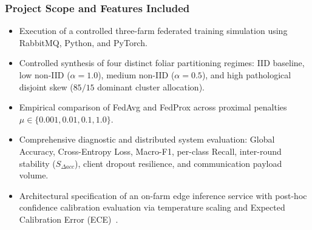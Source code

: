 \documentclass[applsci,article,submit,oneauthor,pdftex]{Definitions/mdpi}
\begin{document}
\subsubsection{Project Scope and Features Included}
\begin{itemize}[leftmargin=*]
    \item Execution of a controlled three-farm federated training simulation using RabbitMQ, Python, and PyTorch.
    \item Controlled synthesis of four distinct foliar partitioning regimes: IID baseline, low non-IID ($\alpha = 1.0$), medium non-IID ($\alpha = 0.5$), and high pathological disjoint skew ($85/15$ dominant cluster allocation).
    \item Empirical comparison of FedAvg and FedProx across proximal penalties $\mu \in \{0.001, 0.01, 0.1, 1.0\}$.
    \item Comprehensive diagnostic and distributed system evaluation: Global Accuracy, Cross-Entropy Loss, Macro-F1, per-class Recall, inter-round stability ($S_{\Delta acc}$), client dropout resilience, and communication payload volume.
    \item Architectural specification of an on-farm edge inference service with post-hoc confidence calibration evaluation via temperature scaling and Expected Calibration Error (ECE)~\cite{guo2017calibration}.
\end{itemize}
\end{document}
